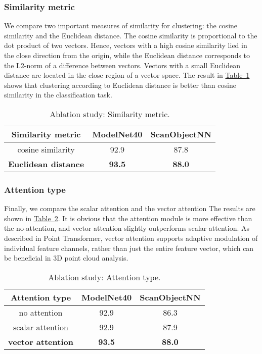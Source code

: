 \documentclass[lettersize,journal]{IEEEtran}
\begin{document}
\subsubsection*{\bf Similarity metric}
We compare two important measures of similarity for clustering: 
the cosine similarity and the Euclidean distance. 
The cosine similarity is proportional to the dot product of two vectors. Hence, 
vectors with a high cosine similarity lied in the close direction from the origin, 
while the Euclidean distance corresponds to the L2-norm of a difference between vectors. 
Vectors with a small Euclidean distance are located in the close region of a vector space.
The result in \hyperref[Table:Similarity metric]{Table~\ref*{Table:Similarity metric}} shows that clustering according to Euclidean distance
is better than cosine similarity in the classification task. 


\begin{table}[h]
  \centering
  \caption{Ablation study: Similarity metric.}
  \label{Table:Similarity metric}
  \begin{tabular}{c|cc}
    \toprule
  Similarity metric   & ModelNet40    & ScanObjectNN  \\ \midrule
  cosine similarity      & 92.9          & 87.8          \\
  \textbf{Euclidean distance}   & \textbf{93.5} & \textbf{88.0} \\ 
  \bottomrule
\end{tabular}
\end{table}

\subsubsection*{\bf Attention type}
Finally,  we compare the scalar attention and the vector attention 
The results are shown in \hyperref[Table:Attention type]{Table~\ref*{Table:Attention type}}. 
It is obvious that the attention module is more effective than the no-attention, 
and vector attention slightly outperforms scalar attention.  
As described in Point Transformer, vector attention supports adaptive modulation of individual feature channels, 
rather than just the entire feature vector, which can be beneficial in 3D point cloud analysis.

\begin{table}[h]
  \caption{Ablation study: Attention type.}
  \label{Table:Attention type}
  \centering
  \begin{tabular}{c|cc}
    \toprule
  Attention type     & ModelNet40    & ScanObjectNN  \\ \midrule
  no attention       & 92.9          & 86.3          \\
  scalar attention   & 92.9          & 87.9          \\
  \textbf{vector attention}   & \textbf{93.5} & \textbf{88.0} \\ 
  \bottomrule
\end{tabular}
\end{table}
\end{document}
